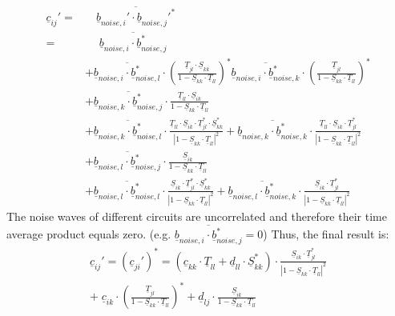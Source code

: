 \documentclass[10pt]{report}
\begin{document}
\begin{equation}
\begin{split}
\underline{c}_{ij}' = & \quad \overline{\underline{b}_{noise,i}'\cdot\underline{b}_{noise,j}'^*} \\
 = & \quad\; \overline{\underline{b}_{noise,i}\cdot\underline{b}_{noise,j}^*} \\
 & + \overline{\underline{b}_{noise,i}\cdot\underline{b}_{noise,l}^*}\cdot
       \left( \frac{\underline{T}_{jl}\cdot \underline{S}_{kk}}{1-\underline{S}_{kk}\cdot\underline{T}_{ll}}
                \right) ^*
       \overline{\underline{b}_{noise,i}\cdot\underline{b}_{noise,k}^*}\cdot
       \left( \frac{\underline{T}_{jl}}{1-\underline{S}_{kk}\cdot\underline{T}_{ll}} \right) ^* \\
 & + \overline{\underline{b}_{noise,k}\cdot\underline{b}_{noise,j}^*}\cdot
       \frac{\underline{T}_{ll}\cdot \underline{S}_{ik}}{1-\underline{S}_{kk}\cdot\underline{T}_{ll}} \\
 & + \overline{\underline{b}_{noise,k}\cdot\underline{b}_{noise,l}^*}\cdot
       \frac{\underline{T}_{ll}\cdot \underline{S}_{ik}\cdot \underline{T}_{jl}^* \cdot\underline{S}_{kk}^*}
            {| 1-\underline{S}_{kk}\cdot\underline{T}_{ll} |^2} +
       \overline{\underline{b}_{noise,k}\cdot\underline{b}_{noise,k}^*}\cdot
       \frac{\underline{T}_{ll}\cdot \underline{S}_{ik}\cdot \underline{T}_{jl}^*}
            {| 1-\underline{S}_{kk}\cdot\underline{T}_{ll} |^2} \\
 & + \overline{\underline{b}_{noise,l}\cdot\underline{b}_{noise,j}^*}\cdot
       \frac{\underline{S}_{ik}}{1-\underline{S}_{kk}\cdot\underline{T}_{ll}} \\
 & + \overline{\underline{b}_{noise,l}\cdot\underline{b}_{noise,l}^*}\cdot
       \frac{\underline{S}_{ik}\cdot \underline{T}_{jl}^*\cdot \underline{S}_{kk}^*}
            {| 1-\underline{S}_{kk}\cdot\underline{T}_{ll} |^2} +
       \overline{\underline{b}_{noise,l}\cdot\underline{b}_{noise,k}^*}\cdot
       \frac{\underline{S}_{ik}\cdot \underline{T}_{jl}^*}
            {| 1-\underline{S}_{kk}\cdot\underline{T}_{ll} |^2}
\end{split}
\end{equation}
The noise waves of different circuits are uncorrelated and therefore
their time average product equals zero. (e.g.
$\overline{\underline{b}_{noise,i}\cdot\underline{b}_{noise,j}^*} = 0$)
Thus, the final result is:
\begin{equation}
\begin{split}
\underline{c}_{ij}' = (\underline{c}_{ji}')^* =
   (\underline{c}_{kk}\cdot\underline{T}_{ll} + \underline{d}_{ll}\cdot\underline{S}_{kk}^*)\cdot
   \frac{\underline{S}_{ik}\cdot\underline{T}_{jl}^*}{|1-\underline{S}_{kk}\cdot\underline{T}_{ll}|^2}
\\ + \;\underline{c}_{ik}\cdot
     \left(\frac{\underline{T}_{jl}}{1-\underline{S}_{kk}\cdot\underline{T}_{ll}}\right)^*
   + \underline{d}_{lj}\cdot
     \frac{\underline{S}_{ik}}{1-\underline{S}_{kk}\cdot\underline{T}_{ll}}
\end{split}
\end{equation}
\end{document}
